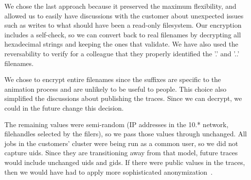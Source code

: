 We chose the last approach because it preserved the maximum
flexibility, and allowed us to easily have discussions with the
customer about unexpected issues such as writes to what should have
been a read-only filesystem.  Our encryption includes a self-check, so
we can convert back to real filenames by decrypting all hexadecimal
strings and keeping the ones that validate.  We have also used the
reversability to verify for a colleague that they properly identified
the '.' and '..' filenames.

We chose to encrypt entire filenames since the suffixes are specific
to the animation process and are unlikely to be useful to people.
This choice also simplified the discussions about publishing the
traces.  Since we can decrypt, we could in the future change this
decision.

The remaining values were semi-random (IP addresses in the 10.*
network, filehandles selected by the filers), so we pass those values
through unchanged.  All jobs in the customers' cluster were being run
as a common user, so we did not capture uids.  Since they are
transitioning away from that model, future traces would include
unchanged uids and gids.  If there were public values in the traces,
then we would have had to apply more sophisticated
anonymization~\cite{ruoming07anonymization}.



